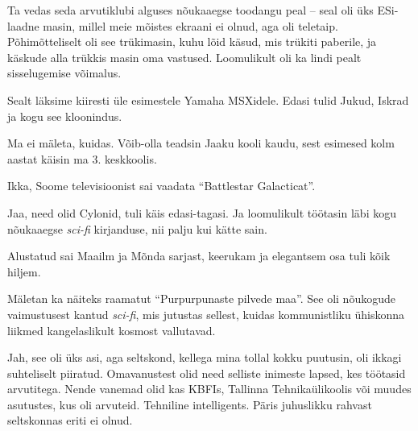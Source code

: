 Ta vedas seda arvutiklubi alguses nõukaaegse toodangu peal -- seal oli üks
ESi-laadne masin, millel meie mõistes ekraani ei olnud, aga oli teletaip. 
Põhimõtteliselt oli see trükimasin, kuhu lõid käsud, mis trükiti 
paberile, ja käskude alla trükkis masin oma vastused. Loomulikult oli ka lindi pealt sisselugemise võimalus.

Sealt läksime kiiresti üle esimestele Yamaha 
MSXidele. Edasi tulid Jukud, 
Iskrad ja kogu see kloonindus.


Ma ei mäleta, kuidas. Võib-olla teadsin Jaaku kooli kaudu, sest esimesed kolm aastat käisin ma 3. keskkoolis.


Ikka, Soome televisioonist sai vaadata \enquote{Battlestar Galacticat}.


Jaa, need olid Cylonid, tuli käis edasi-tagasi. Ja loomulikult töötasin läbi kogu nõukaaegse 
\emph{sci-fi} kirjanduse, nii palju kui kätte sain.


Alustatud sai Maailm ja Mõnda sarjast, keerukam ja elegantsem osa tuli kõik hiljem. 

Mäletan ka näiteks raamatut \enquote{Purpurpunaste pilvede 
maa}. See oli nõukogude vaimustusest 
kantud \emph{sci-fi}, mis jutustas sellest, kuidas kommunistliku ühiskonna liikmed 
kangelaslikult kosmost vallutavad.


Jah, see oli üks asi, aga seltskond, kellega mina tollal kokku puutusin, oli 
ikkagi suhteliselt piiratud. Omavanustest olid need selliste inimeste 
lapsed, kes töötasid arvutitega. Nende vanemad olid kas 
KBFIs, Tallinna Tehnikaülikoolis või muudes asutustes, kus oli arvuteid. 
Tehniline intelligents. Päris juhuslikku rahvast seltskonnas eriti ei 
olnud.

